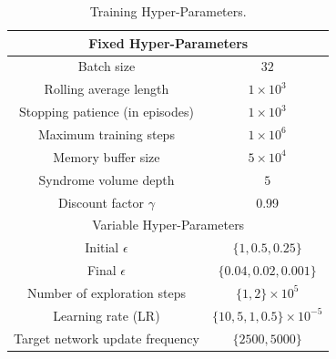 \documentclass[twocolumn,preprintnumbers,amsmath,amssymb,notitlepage,nofootinbib,longbibliography,superscriptaddress,aps,pra,10pt]{revtex4-1}
\begin{document}
	\begin{table}[hb]
	\begin{center}
		\begin{tabular}{| c | c | }
			\hline
			\multicolumn{2}{|c|}{Fixed Hyper-Parameters} \\
			\hline
			Batch size & $32$  \\ 
			Rolling average length & $1\times10^3$ \\ 
			Stopping patience (in episodes) & $1\times10^3$  \\
			Maximum training steps & $1\times10^6$  \\ 
			Memory buffer size & $5\times 10^4$ \\ 
			Syndrome volume depth & $5$ \\
			Discount factor $\gamma$ & 0.99 \\
			\hline
			\multicolumn{2}{|c|}{Variable Hyper-Parameters} \\
			\hline
			Initial $\epsilon$ & $\{1, 0.5, 0.25\}$ \\ 
			Final $\epsilon$ & $\{0.04, 0.02, 0.001\}$  \\
			Number of exploration steps & $\{1,2\}\times10^5$  \\ 
			Learning rate (LR)& $\{10,5,1,0.5\}\times10^{-5}$  \\ 
			Target network update frequency & $\{2500, 5000\}$ \\ 
			\hline
		\end{tabular}
		\caption{
			Training Hyper-Parameters.
		}
		\label{t:hyper_parameters}
	\end{center}
	\end{table}
\end{document}
